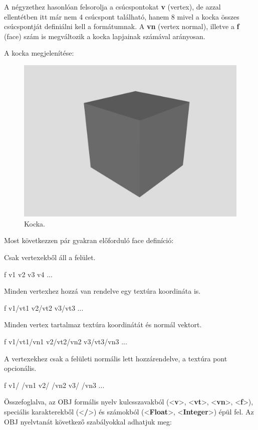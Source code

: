 A négyzethez hasonlóan felsorolja a csúcspontokat \textbf{v} (vertex), de azzal ellentétben itt már nem 4 csúcspont található, hanem 8 mivel a kocka összes csúcspontját definiálni kell a formátumnak. A \textbf{vn} (vertex normal), illetve a \textbf{f} (face) szám is megváltozik a kocka lapjainak számával arányosan.\newline

\noindent A kocka megjelenítése:
\begin{figure}[h]
\centering
\includegraphics[scale=0.16]{images/cube_notexture.png}
\caption{Kocka.}
\end{figure}

\noindent Most következzen pár gyakran előforduló face definíció:\newline

\noindent Csak vertexekből áll a felület.
\begin{cpp} 
f v1 v2 v3 v4 ...
\end{cpp}
Minden vertexhez hozzá van rendelve egy textúra koordináta is.
\begin{cpp} 
f v1/vt1 v2/vt2 v3/vt3 ...
\end{cpp}
Minden vertex tartalmaz textúra koordinátát és normál vektort.
\begin{cpp} 
f v1/vt1/vn1 v2/vt2/vn2 v3/vt3/vn3 ...
\end{cpp}
A vertexekhez csak a felületi normális lett hozzárendelve, a textúra pont opcionális.
\begin{cpp} 
f v1/ /vn1 v2/ /vn2 v3/ /vn3 ...
\end{cpp}
Összefoglalva, az OBJ formális nyelv kulcsszavakból (<\textbf{v}>, <\textbf{vt}>, <\textbf{vn}>, <\textbf{f}>), speciális karakterekből (<\textbf{/}>) és számokból (<\textbf{Float}>, <\textbf{Integer}>) épül fel. Az OBJ nyelvtanát következő szabályokkal adhatjuk meg:\\

